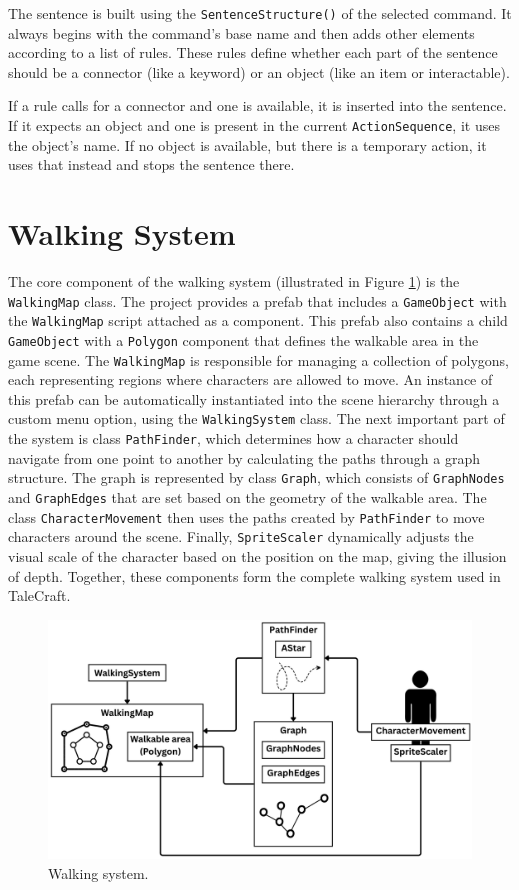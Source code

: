 The sentence is built using the \verb|SentenceStructure()| of the selected command. It always begins with the command’s base name and then adds other elements according to a list of rules. These rules define whether each part of the sentence should be a connector (like a keyword) or an object (like an item or interactable).

If a rule calls for a connector and one is available, it is inserted into the sentence. If it expects an object and one is present in the current \verb|ActionSequence|, it uses the object's name. If no object is available, but there is a temporary action, it uses that instead and stops the sentence there.


\section{Walking System}
\label{Walkingystem}
The core component of the walking system (illustrated in Figure \ref{fig:WalkingSys}) is the \verb|WalkingMap| class. The project provides a prefab that includes a \verb|GameObject| with the \verb|WalkingMap| script attached as a component. This prefab also contains a child \verb|GameObject| with a \verb|Polygon| component that defines the walkable area in the game scene. The \verb|WalkingMap| is responsible for managing a collection of polygons, each representing regions where characters are allowed to move. An instance of this prefab can be automatically instantiated into the scene hierarchy through a custom menu option, using the \verb|WalkingSystem| class. The next important part of the system is class \verb|PathFinder|, which determines how a character should navigate from one point to another by calculating the paths through a graph structure. The graph is represented by class \verb|Graph|, which consists of \verb|GraphNodes| and \verb|GraphEdges| that are set based on the geometry of the walkable area. The class \verb|CharacterMovement| then uses the paths created by \verb|PathFinder| to move characters around the scene. Finally, \verb|SpriteScaler| dynamically adjusts the visual scale of the character based on the position on the map, giving the illusion of depth. Together, these components form the complete walking system used in TaleCraft.


\begin{figure}[H]
\centering
\includegraphics[width=0.85\linewidth]{img/Walking2.png}
\caption{Walking system.}
\label{fig:WalkingSys}
\end{figure}

